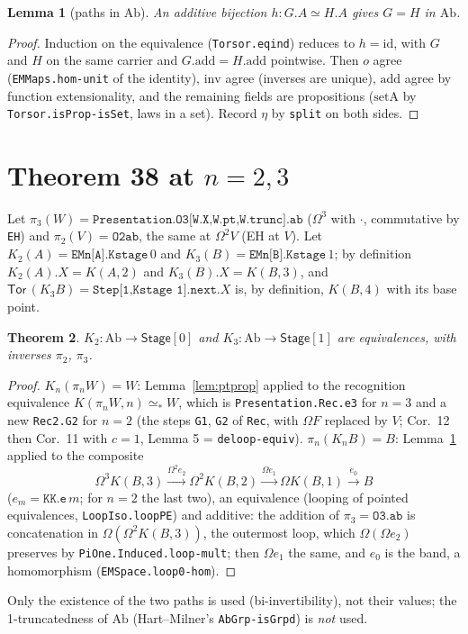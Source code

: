 \documentclass[11pt]{amsart}
\newtheorem{theorem}{Theorem}
\newtheorem{lemma}[theorem]{Lemma}
\theoremstyle{definition}
\theoremstyle{remark}
\newcommand{\Om}{\Omega}
\newcommand{\code}[1]{\texttt{#1}}
\newcommand{\Ab}{\mathrm{Ab}}
\newcommand{\St}{\mathsf{Stage}}
\newcommand{\Tor}{\mathsf{Tor}}
\newcommand{\pteq}{\simeq_*}
\begin{document}
\begin{lemma}[paths in $\Ab$]\label{lem:ab}
An additive bijection $h:G.A\simeq H.A$ gives $G=H$ in $\Ab$.
\end{lemma}
\begin{proof} Induction on the equivalence (\code{Torsor.eqind}) reduces to $h=\mathrm{id}$, with
$G$ and $H$ on the same carrier and $G.\mathrm{add}=H.\mathrm{add}$ pointwise. Then $o$ agree
(\code{EMMaps.hom-unit} of the identity), $\mathrm{inv}$ agree (inverses are unique), $\mathrm{add}$
agree by function extensionality, and the remaining fields are propositions ($\mathrm{setA}$
by \code{Torsor.isProp-isSet}, laws in a set). Record $\eta$ by \code{split} on both sides. \end{proof}

\section{Theorem 38 at $n=2,3$}

Let $\pi_3(W)=\code{Presentation.O3[W.X,W.pt,W.trunc].ab}$ ($\Om^3$ with $\cdot$, commutative by
\code{EH}) and $\pi_2(V)=\code{O2ab}$, the same at $\Om^2V$ (EH at $V$). Let
$K_2(A)=\code{EMn[A].Kstage}\,0$ and $K_3(B)=\code{EMn[B].Kstage}\,1$; by definition
$K_2(A).X=K(A,2)$ and $K_3(B).X=K(B,3)$, and $\Tor\,(K_3B)=\code{Step[1,Kstage 1].next}.X$ is,
by definition, $K(B,4)$ with its base point.

\begin{theorem}\label{thm:em}
$K_2:\Ab\to\St[0]$ and $K_3:\Ab\to\St[1]$ are equivalences, with inverses $\pi_2$, $\pi_3$.
\end{theorem}
\begin{proof} $K_n(\pi_n W)=W$: Lemma~\ref{lem:ptprop} applied to the recognition
equivalence $K(\pi_nW,n)\pteq W$, which is \code{Presentation.Rec.e3} for $n=3$ and a new
\code{Rec2.G2} for $n=2$ (the steps \code{G1}, \code{G2} of \code{Rec}, with $\Om F$ replaced by
$V$; Cor.~12 then Cor.~11 with $c=1$, Lemma 5 = \code{deloop-equiv}).
$\pi_n(K_nB)=B$: Lemma~\ref{lem:ab} applied to the composite
\[\Om^3K(B,3)\xrightarrow{\Om^2 e_2}\Om^2K(B,2)\xrightarrow{\Om e_1}\Om K(B,1)\xrightarrow{e_0}B\]
($e_m=\code{KK.e}\,m$; for $n=2$ the last two), an equivalence (looping of pointed equivalences,
\code{LoopIso.loopPE}) and additive: the addition of $\pi_3=\code{O3.ab}$ is concatenation in
$\Om(\Om^2K(B,3))$, the outermost loop, which $\Om(\Om e_2)$ preserves by
\code{PiOne.Induced.loop-mult}; then $\Om e_1$ the same, and $e_0$ is the band, a homomorphism
(\code{EMSpace.loop0-hom}). \end{proof}
Only the existence of the two paths is used (bi-invertibility), not their values; the
1-truncatedness of $\Ab$ (Hart--Milner's \code{AbGrp-isGrpd}) is \emph{not} used.
\end{document}
